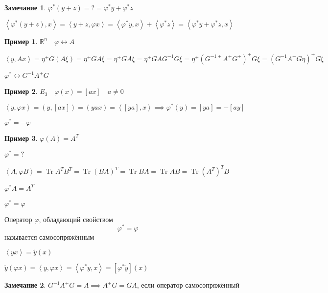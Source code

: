 \documentclass{book}
\newcommand\R{\ensuremath{\mathbb{R}}}
\newcommand{\tl}[1]{\widetilde{#1}}
\DeclareMathOperator{\Tr}{Tr}
\theoremstyle{definition}
\newtheorem*{note}{Замечание}
\newtheorem*{example}{Пример}
\begin{document}
\begin{note}
    $\varphi^*(y + z) = ? = \varphi^* y + \varphi^* z$

    $\left<\varphi^*(y+z), x \right> = \left<y+z, \varphi x \right> = \left<\varphi^* y, x \right> + \left< \varphi^* z \right> = \left<\varphi^* y + \varphi^* z, x \right>$
\end{note}
\begin{example}
    $\R^n\quad \varphi \longleftrightarrow A $ 

    $\left<y, Ax \right> = \eta^+G(A \xi) = \eta^+ GA\xi = \eta^+GA\xi = \eta^+GAG^{-1}G\xi = \eta^+ \left( G^{-1+}A^+G^+ \right) ^+G\xi = (G^{-1}A^+G\eta)^+G\xi$

    $\varphi^* \longleftrightarrow G^{-1}A^+G$
\end{example}

\begin{example}
    $E_3\quad \varphi(x) = [a x]\quad a\neq 0$

    $\left<y, \varphi x \right> = \left( y, [a x] \right)  = \left( y a x \right)  = \left<[y a], x \right> \implies \varphi^*(y) = [y a] = -[a y]$

    $\varphi^*  = -\varphi$
\end{example}

\begin{example}
    $\varphi(A) = A^T$

     $\varphi^* = ?$

     $\left<A, \varphi B \right> = \Tr A^TB^T = \Tr \left( BA \right) ^T = \Tr BA = \Tr AB = \Tr (A^T)^TB$

     $\varphi^* A = A^T$

      $\varphi^* = \varphi$
\end{example}

\begin{definition}
    Оператор $\varphi$, обладающий свойством  \[\varphi^* = \varphi\] называется самосопряжённым

    $\left< y x \right> = \tl y(x)$
\end{definition}

    $\tl y(\varphi x) = \left< y, \varphi x \right> = \left<\varphi^* y, x \right> = [\varphi^* \tl y](x)$

\begin{note}
    $G^{-1}A^+G = A \implies  A^+G = GA$, если оператор самосопряжённый
\end{note}
\end{document}
